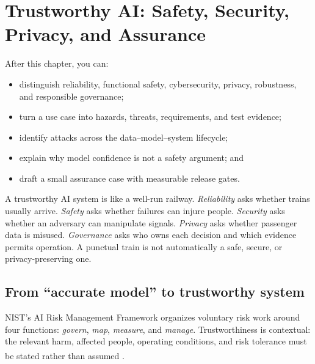 
\chapter{Trustworthy AI: Safety, Security, Privacy, and Assurance}

\label{ch:trustworthy-ai}

\begin{learningobjectives}
After this chapter, you can:
\begin{itemize}
    \item distinguish reliability, functional safety, cybersecurity, privacy,
          robustness, and responsible governance;
    \item turn a use case into hazards, threats, requirements, and test
          evidence;
    \item identify attacks across the data--model--system lifecycle;
    \item explain why model confidence is not a safety argument; and
    \item draft a small assurance case with measurable release gates.
\end{itemize}
\end{learningobjectives}

\begin{plainlanguage}
A trustworthy AI system is like a well-run railway. \emph{Reliability} asks
whether trains usually arrive. \emph{Safety} asks whether failures can injure
people. \emph{Security} asks whether an adversary can manipulate signals.
\emph{Privacy} asks whether passenger data is misused. \emph{Governance} asks
who owns each decision and which evidence permits operation. A punctual train
is not automatically a safe, secure, or privacy-preserving one.
\end{plainlanguage}

\section{From ``accurate model'' to trustworthy system}

NIST's AI Risk Management Framework organizes voluntary risk work around four
functions: \emph{govern}, \emph{map}, \emph{measure}, and \emph{manage}.
Trustworthiness is contextual: the relevant harm, affected people, operating
conditions, and risk tolerance must be stated rather than assumed
\textsuperscript{\cite{nistAIRiskManagement2023}}.

